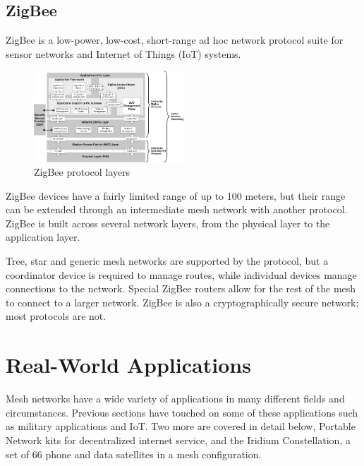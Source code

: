 \documentclass[conference]{IEEEtran}
\begin{document}
\subsection{ZigBee}
ZigBee is a low-power, low-cost, short-range ad hoc network protocol suite for sensor networks and Internet of Things (IoT) systems.  
\begin{figure}[h]
    \includegraphics[width=0.5\textwidth]{zigbee.jpg}
    \caption{ZigBee protocol layers\cite{amin_saeed_2018}}
\end{figure}
ZigBee devices have a fairly limited range of up to 100 meters, but their range can be extended through an intermediate mesh network with another protocol.
ZigBee is built across several network layers, from the physical layer to the application layer. 

Tree, star and generic mesh networks are supported by the protocol, but a coordinator device is required to manage routes, while individual devices manage connections to the network\cite{enwiki:999715964}.  Special 
ZigBee routers allow for the rest of the mesh to connect to a larger network.  ZigBee is also a cryptographically secure network; most protocols are not.  
\section{Real-World Applications}
Mesh networks have a wide variety of applications in many different fields and circumstances.  Previous sections have touched on some of these applications such as military applications and IoT. Two more are covered in detail below, Portable Network kits for decentralized internet service, 
and the Iridium Constellation, a set of 66 phone and data satellites in a mesh configuration.
\end{document}
